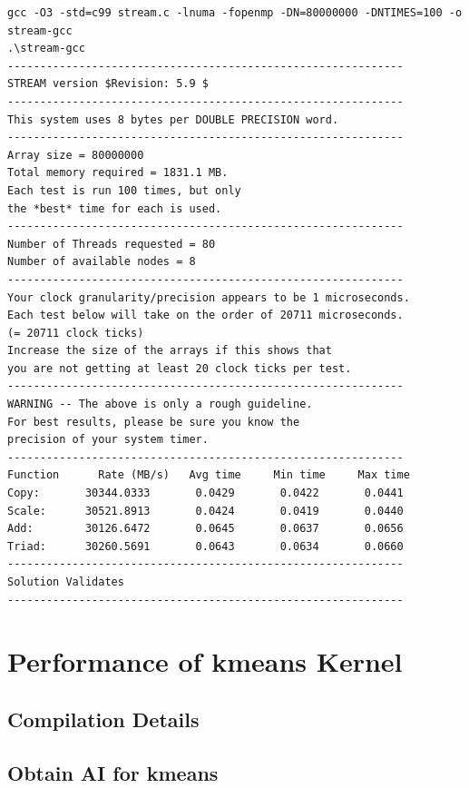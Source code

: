\begin{center}
\begin{lstlisting}[basicstyle=\tiny]
gcc -O3 -std=c99 stream.c -lnuma -fopenmp -DN=80000000 -DNTIMES=100 -o stream-gcc
.\stream-gcc
-------------------------------------------------------------
STREAM version $Revision: 5.9 $
-------------------------------------------------------------
This system uses 8 bytes per DOUBLE PRECISION word.
-------------------------------------------------------------
Array size = 80000000
Total memory required = 1831.1 MB.
Each test is run 100 times, but only
the *best* time for each is used.
-------------------------------------------------------------
Number of Threads requested = 80
Number of available nodes = 8
-------------------------------------------------------------
Your clock granularity/precision appears to be 1 microseconds.
Each test below will take on the order of 20711 microseconds.
(= 20711 clock ticks)
Increase the size of the arrays if this shows that
you are not getting at least 20 clock ticks per test.
-------------------------------------------------------------
WARNING -- The above is only a rough guideline.
For best results, please be sure you know the
precision of your system timer.
-------------------------------------------------------------
Function      Rate (MB/s)   Avg time     Min time     Max time
Copy:       30344.0333       0.0429       0.0422       0.0441
Scale:      30521.8913       0.0424       0.0419       0.0440
Add:        30126.6472       0.0645       0.0637       0.0656
Triad:      30260.5691       0.0643       0.0634       0.0660
-------------------------------------------------------------
Solution Validates
-------------------------------------------------------------
\end{lstlisting}
\end{center}

\section{Performance of kmeans Kernel}

\subsection{Compilation Details}

\subsection{Obtain AI for kmeans}

